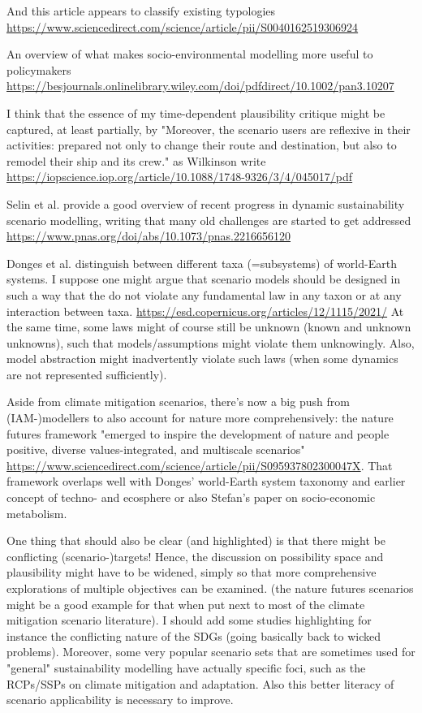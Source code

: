 \documentclass{article}
\begin{document}
And this article appears to classify existing typologies \url{https://www.sciencedirect.com/science/article/pii/S0040162519306924}

An overview of what makes socio-environmental modelling more useful to policymakers \url{https://besjournals.onlinelibrary.wiley.com/doi/pdfdirect/10.1002/pan3.10207}

I think that the essence of my time-dependent plausibility critique might be captured, at least partially, by "Moreover, the scenario users are reflexive in their activities: prepared not only to change their route and destination, but also to remodel their ship and its crew." as Wilkinson write \url{https://iopscience.iop.org/article/10.1088/1748-9326/3/4/045017/pdf}

Selin et al. provide a good overview of recent progress in dynamic sustainability scenario modelling, writing that many old challenges are started to get addressed \url{https://www.pnas.org/doi/abs/10.1073/pnas.2216656120}

Donges et al. distinguish between different taxa (=subsystems) of world-Earth systems. I suppose one might argue that scenario models should be designed in such a way that the do not violate any fundamental law in any taxon or at any interaction between taxa. \url{https://esd.copernicus.org/articles/12/1115/2021/} At the same time, some laws might of course still be unknown (known and unknown unknowns), such that models/assumptions might violate them unknowingly. Also, model abstraction might inadvertently violate such laws (when some dynamics are not represented sufficiently).

Aside from climate mitigation scenarios, there's now a big push from (IAM-)modellers to also account for nature more comprehensively: the nature futures framework "emerged to inspire the development of nature and people positive, diverse values-integrated, and multiscale scenarios" \url{https://www.sciencedirect.com/science/article/pii/S095937802300047X}. That framework overlaps well with Donges' world-Earth system taxonomy and earlier concept of techno- and ecosphere or also Stefan's paper on socio-economic metabolism.

One thing that should also be clear (and highlighted) is that there might be conflicting (scenario-)targets! Hence, the discussion on possibility space and plausibility might have to be widened, simply so that more comprehensive explorations of multiple objectives can be examined. (the nature futures scenarios might be a good example for that when put next to most of the climate mitigation scenario literature). I should add some studies highlighting for instance the conflicting nature of the SDGs (going basically back to wicked problems). Moreover, some very popular scenario sets that are sometimes used for "general" sustainability modelling have actually specific foci, such as the RCPs/SSPs on climate mitigation and adaptation. Also this better literacy of scenario applicability is necessary to improve.
\end{document}
